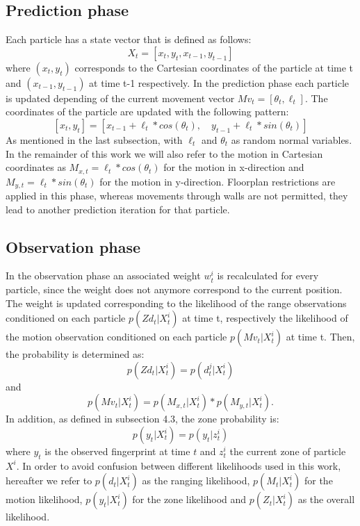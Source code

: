 \subsection{Prediction phase}
Each particle has a state vector that is defined as follows:
$$X_{t} = [x_{t}, y_{t}, x_{t-1}, y_{t-1}]$$
where $(x_{t}, y_{t})$ corresponds to the Cartesian coordinates of the particle at time t and $(x_{t-1}, y_{t-1})$ at time t-1 respectively. In the prediction phase each particle is updated depending of the current movement vector $Mv_{t} = [\theta_{t}, \ell_{t}]$. The coordinates of the particle are updated with the following pattern:
$$[x_{t}, y_{t}]  = [x_{t-1} + \ell_{t} * cos(\theta_{t}),\quad y_{t-1} + \ell_{t} * sin(\theta_{t})]$$
As mentioned in the last subsection, with $\ell_{t}$ and $\theta_{t}$ as random normal variables. In the remainder of this work we will also refer to the motion in Cartesian coordinates as $M_{x,t} = \ell_{t} * cos(\theta_{t})$ for the motion in x-direction and $M_{y,t} = \ell_{t} * sin(\theta_{t})$ for the motion in y-direction.
Floorplan restrictions are applied in this phase, whereas movements through walls are not permitted, they lead to another prediction iteration for that particle.

\subsection{Observation phase}
In the observation phase an associated weight $w^{i}_{t}$ is recalculated for every particle, since the weight does not anymore correspond to the current position. The weight is updated corresponding to the likelihood of the range observations conditioned on each particle $p(Zd_{t} | X^{i}_{t})$ at time t, respectively the likelihood of the motion observation conditioned on each particle $p(Mv_{t} | X^{i}_{t})$ at time t. Then, the probability is determined as:
$$ p(Zd_{t} | X^{i}_{t}) = p(d_{t}^{j} | X^{i}_{t}) $$
and $$ p(Mv_{t} | X^{i}_{t}) = p(M_{x,t} | X^{i}_{t}) * p(M_{y,t} | X^{i}_{t}).$$ %
In addition, as defined in subsection 4.3, the zone probability is:
$$ p(y_t | X^{i}_{t}) = p(y_{t} | z^{i}_{t})$$
where $y_t$ is the observed fingerprint at time $t$ and $z^{i}_{t}$ the current zone of particle $X^{i}$.
In order to avoid confusion between different likelihoods used in this work, hereafter we refer to $p(d_{t} | X^{i}_{t})$ as the ranging likelihood, $p(M_{t} | X^{i}_{t})$ for the motion likelihood, $p(y_t | X^{i}_{t})$ for the zone likelihood and $p(Z_{t} | X^{i}_{t})$ as the overall likelihood.


